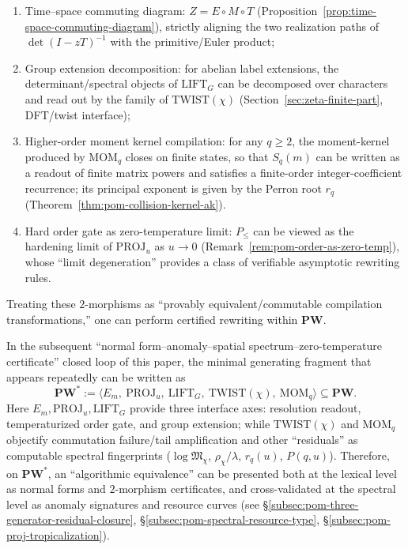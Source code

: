 \begin{definition}
\begin{itemize}
\begin{enumerate}
    \item Time--space commuting diagram: $Z=E\circ M\circ T$ (Proposition~\ref{prop:time-space-commuting-diagram}), strictly aligning the two realization paths of $\det(I-zT)^{-1}$ with the primitive/Euler product;
    \item Group extension decomposition: for abelian label extensions, the determinant/spectral objects of $\mathrm{LIFT}_G$ can be decomposed over characters and read out by the family of $\mathrm{TWIST}(\chi)$ (Section~\ref{sec:zeta-finite-part}, DFT/twist interface);
    \item Higher-order moment kernel compilation: for any \(q\ge2\), the moment-kernel produced by $\mathrm{MOM}_q$ closes on finite states, so that \(S_q(m)\) can be written as a readout of finite matrix powers and satisfies a finite-order integer-coefficient recurrence; its principal exponent is given by the Perron root \(r_q\) (Theorem~\ref{thm:pom-collision-kernel-ak}).
    \item Hard order gate as zero-temperature limit: $P_{\le}$ can be viewed as the hardening limit of $\mathrm{PROJ}_u$ as $u\to 0$ (Remark~\ref{rem:pom-order-as-zero-temp}), whose ``limit degeneration'' provides a class of verifiable asymptotic rewriting rules.
  \end{enumerate}
\end{itemize}
Treating these $2$-morphisms as ``provably equivalent/commutable compilation transformations,'' one can perform certified rewriting within $\mathbf{PW}$.
\end{definition}

\begin{remark}\label{rem:pom-pw-star-fragment}
In the subsequent ``normal form--anomaly--spatial spectrum--zero-temperature certificate'' closed loop of this paper, the minimal generating fragment that appears repeatedly can be written as
\[
\mathbf{PW}^{\ast}:=\langle E_m,\ \mathrm{PROJ}_u,\ \mathrm{LIFT}_G,\ \mathrm{TWIST}(\chi),\ \mathrm{MOM}_q\rangle\subseteq \mathbf{PW}.
\]
Here \(E_m,\mathrm{PROJ}_u,\mathrm{LIFT}_G\) provide three interface axes: resolution readout, temperaturized order gate, and group extension;
while \(\mathrm{TWIST}(\chi)\) and \(\mathrm{MOM}_q\) objectify commutation failure/tail amplification and other ``residuals'' as computable spectral fingerprints (\(\log\mathfrak{M}_\chi\), \(\rho_\chi/\lambda\), \(r_q(u)\), \(P(q,u)\)).
Therefore, on \(\mathbf{PW}^{\ast}\), an ``algorithmic equivalence'' can be presented both at the lexical level as normal forms and \(2\)-morphism certificates, and cross-validated at the spectral level as anomaly signatures and resource curves (see \S\ref{subsec:pom-three-generator-residual-closure}, \S\ref{subsec:pom-spectral-resource-type}, \S\ref{subsec:pom-proj-tropicalization}).
\end{remark}

